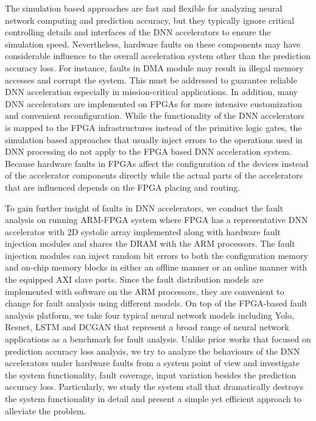 The simulation based approaches are fast and flexible for analyzing 
neural network computing and prediction accuracy, but they typically 
ignore critical controlling details and interfaces of 
the DNN accelerators to ensure the simulation speed. Nevertheless,
hardware faults on these components may have considerable influence 
to the overall acceleration system other than the prediction 
accuracy loss. For instance, faults in DMA 
module may result in illegal memory accesses and corrupt the system.
This must be addressed to guarantee reliable DNN 
acceleration especially in mission-critical applications.
In addition, many DNN accelerators are implemented on FPGAs for 
more intensive customization and convenient reconfiguration. 
While the functionality of the DNN accelerators is mapped to the 
FPGA infrastructures instead of the primitive logic gates, 
the simulation based approaches that usually inject errors to the 
operations used in DNN processing do not apply to the 
FPGA based DNN acceleration system. Because hardware faults 
in FPGAs affect the configuration of the devices instead of the 
accelerator components directly while the actual parts of the 
accelerators that are influenced depends on the FPGA placing 
and routing. 

To gain further insight of faults in DNN accelerators, 
we conduct the fault analysis on running ARM-FPGA system 
where FPGA has a representative DNN accelerator with 2D systolic array 
implemented along with hardware fault injection modules and shares 
the DRAM with the ARM processors. The fault injection modules can inject
random bit errors to both the configuration memory and on-chip memory 
blocks in either an offline manner or an online manner with the equipped 
AXI slave ports. Since the fault distribution models are implemented 
with software on the ARM processors, they are convenient to change for fault 
analysis using different models. On top of the FPGA-based fault 
analysis platform, we take four typical neural network models 
including Yolo, Resnet, LSTM and DCGAN that represent a broad range of 
neural network applications as a benchmark for fault analysis.
Unlike prior works that focused on prediction accuracy loss analysis, 
we try to analyze the behaviours of the DNN accelerators under hardware faults
from a system point of view and investigate the system functionality, 
fault coverage, input variation besides the prediction accuracy loss. 
Particularly, we study the system stall that dramatically destroys the system 
functionality in detail and present a simple yet efficient approach 
to alleviate the problem.

